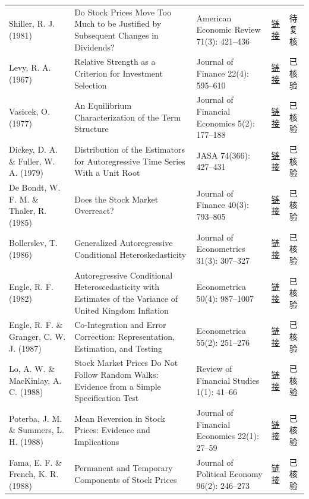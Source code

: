 \begin{longtable}{@{}>{\raggedright\arraybackslash}p{2.55cm}>{\raggedright\arraybackslash}p{4.7cm}>{\raggedright\arraybackslash}p{2.7cm}>{\raggedright\arraybackslash}p{1.9cm}>{\raggedright\arraybackslash}p{1.45cm}@{}}
Shiller, R. J. (1981) & Do Stock Prices Move Too Much to be Justified by Subsequent Changes in Dividends? & American Economic Review 71(3): 421--436 & \href{https://www.nber.org/papers/w0456}{链接} & 待复核 \\
Levy, R. A. (1967) & Relative Strength as a Criterion for Investment Selection & Journal of Finance 22(4): 595--610 & \href{https://doi.org/10.1111/j.1540-6261.1967.tb00295.x}{链接} & 已核验 \\
Vasicek, O. (1977) & An Equilibrium Characterization of the Term Structure & Journal of Financial Economics 5(2): 177--188 & \href{https://doi.org/10.1016/0304-405X(77)90016-2}{链接} & 已核验 \\
Dickey, D. A. \& Fuller, W. A. (1979) & Distribution of the Estimators for Autoregressive Time Series With a Unit Root & JASA 74(366): 427--431 & \href{https://doi.org/10.1080/01621459.1979.10482531}{链接} & 已核验 \\
De Bondt, W. F. M. \& Thaler, R. (1985) & Does the Stock Market Overreact? & Journal of Finance 40(3): 793--805 & \href{https://doi.org/10.1111/j.1540-6261.1985.tb05004.x}{链接} & 已核验 \\
Bollerslev, T. (1986) & Generalized Autoregressive Conditional Heteroskedasticity & Journal of Econometrics 31(3): 307--327 & \href{https://doi.org/10.1016/0304-4076(86)90063-1}{链接} & 已核验 \\
Engle, R. F. (1982) & Autoregressive Conditional Heteroscedasticity with Estimates of the Variance of United Kingdom Inflation & Econometrica 50(4): 987--1007 & \href{https://doi.org/10.2307/1912773}{链接} & 已核验 \\
Engle, R. F. \& Granger, C. W. J. (1987) & Co-Integration and Error Correction: Representation, Estimation, and Testing & Econometrica 55(2): 251--276 & \href{https://doi.org/10.2307/1913236}{链接} & 已核验 \\
Lo, A. W. \& MacKinlay, A. C. (1988) & Stock Market Prices Do Not Follow Random Walks: Evidence from a Simple Specification Test & Review of Financial Studies 1(1): 41--66 & \href{https://doi.org/10.1093/rfs/1.1.41}{链接} & 已核验 \\
Poterba, J. M. \& Summers, L. H. (1988) & Mean Reversion in Stock Prices: Evidence and Implications & Journal of Financial Economics 22(1): 27--59 & \href{https://doi.org/10.1016/0304-405X(88)90021-9}{链接} & 已核验 \\
Fama, E. F. \& French, K. R. (1988) & Permanent and Temporary Components of Stock Prices & Journal of Political Economy 96(2): 246--273 & \href{https://doi.org/10.1086/261535}{链接} & 已核验 \\

\end{longtable}
